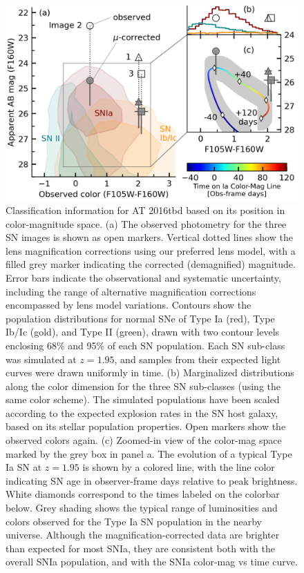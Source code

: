 \documentclass[12pt]{article}
\def\SNABC{AT 2016tbd\xspace}
\begin{document}
\clearpage
\begin{figure}
  \centering
    \includegraphics[draft=False, width=\textwidth]{Paper/Figures/snRequiem_classcontours_timeline_hist.png}
    \caption{Classification information for \SNABC based on its position in color-magnitude space. (a) 
    The observed photometry for the three SN images is shown as open markers. Vertical dotted lines show the lens magnification corrections using our preferred lens model, with a filled grey marker indicating the corrected (demagnified) magnitude. Error bars indicate the observational and systematic uncertainty, including the range of alternative magnification corrections encompassed by lens model variations.
    Contours show the population distributions for normal SNe of Type Ia (red), Type Ib/Ic (gold), and Type II (green), drawn with two contour levels enclosing 68\%  and 95\%  of each SN population.  Each SN sub-class was simulated at $z=1.95$, and samples from their expected light curves were drawn uniformly in time.  
    (b) Marginalized distributions along the color dimension for the three SN sub-classes (using the same color scheme).  The simulated populations have been scaled according to the expected explosion rates in the SN host galaxy, based on its stellar population properties. Open markers show the observed colors again.
    (c) Zoomed-in view of the color-mag space marked by the grey box in panel a.
    The evolution of a typical Type Ia SN at $z=1.95$  is shown by a colored line, with the line color indicating SN age in observer-frame days relative to peak brightness.  White diamonds correspond to the times labeled on the colorbar below. Grey shading shows the typical range of luminosities and colors observed for the Type Ia SN population in the nearby universe. %
    Although the magnification-corrected data are brighter than expected for most SNIa, they are consistent both with the overall SNIa population, and with the SNIa color-mag vs time curve.  
    \label{fig:class}
    }
\end{figure}
\end{document}
